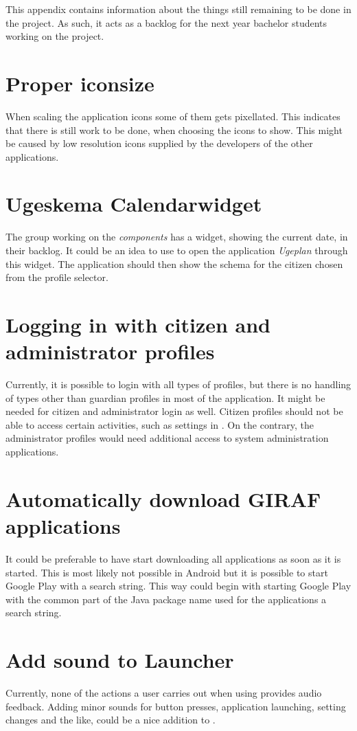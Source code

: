 This appendix contains information about the things still remaining to be done in the \launcher project.
As such, it acts as a backlog for the next year bachelor students working on the project.

\section{Proper iconsize}
When scaling the application icons some of them gets pixellated.
This indicates that there is still work to be done, when choosing the icons to show.
This might be caused by low resolution icons supplied by the developers of the other applications.

\section{Ugeskema Calendarwidget}
The group working on the \textit{\giraf components} has a widget, showing the current date, in their backlog.
It could be an idea to use to open the application \textit{Ugeplan} through this widget. The application should then show the schema for the citizen chosen from the profile selector.

\section{Logging in with citizen and administrator profiles}
Currently, it is possible to login with all types of profiles, but there is no handling of types other than guardian profiles in most of the application.
It might be needed for citizen and administrator login as well.
Citizen profiles should not be able to access certain activities, such as settings in \launcher.
On the contrary, the administrator profiles would need additional access to system administration applications.

\section{Automatically download GIRAF applications}
It could be preferable to have \launcher start downloading all \giraf applications as soon as it is started.
This is most likely not possible in Android but it is possible to start Google Play with a search string.
This way  \launcher could begin with starting Google Play with the common part of the Java package name used for the \giraf applications a search string.

\section{Add sound to Launcher}
Currently, none of the actions a user carries out when using \launcher provides audio feedback.
Adding minor sounds for button presses, application launching, setting changes and the like, could be a nice addition to \launcher. 

